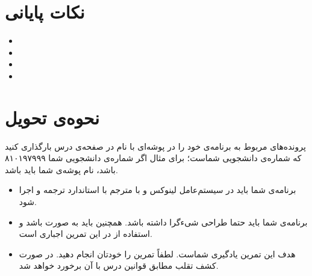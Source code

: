 \documentclass{utap}
\begin{document}
	\section{نکات پایانی}
		\begin{itemize}
			\item
			\item
			\item
			\item
		\end{itemize}

	\section{نحوه‌ی تحویل}
		پرونده‌‌های مربوط به برنامه‌ی خود را در پوشه‌ای با نام  در صفحه‌ی  درس بارگذاری کنید که  شماره‌ی دانشجویی شماست؛ برای مثال اگر شماره‌ی دانشجویی شما ۸۱۰۱۹۷۹۹۹ باشد، نام پوشه‌ی شما باید  باشد.
		\begin{itemize}
			\item
						برنامه‌ی شما باید در سیستم‌عامل لینوکس و با مترجم  با استاندارد  ترجمه و اجرا شود.
					\item
						برنامه‌ی شما باید حتما طراحی شیءگرا داشته باشد. همچنین باید به صورت  باشد و استفاده از  در این تمرین اجباری است.
					\item
						هدف این تمرین یادگیری شماست. لطفاً تمرین را خودتان انجام دهید. در صورت کشف تقلب مطابق قوانین درس با آن برخورد خواهد شد.
		\end{itemize}
\end{document}
